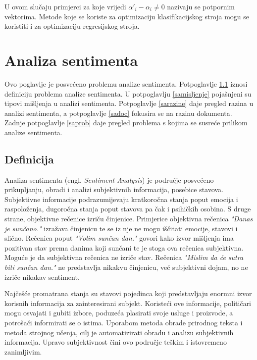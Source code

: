 \documentclass[times, utf8, zavrsni, numeric]{fer}
\begin{document}
U ovom slučaju primjerci za koje vrijedi $\alpha'_i - \alpha_i \neq 0$ nazivaju se potpornim vektorima.
Metode koje se koriste za optimizaciju klasifikacijskog stroja mogu se koristiti i za optimizaciju
regresijskog stroja.

\chapter{Analiza sentimenta} \label{sentiment}
Ovo poglavlje je posvećeno problemu analize sentimenta.
Potpoglavlje \ref{def} iznosi definiciju problema analize sentimenta.
U potpoglavlju \ref{samisljenje} pojašnjeni su tipovi mišljenja u analizi sentimenta.
Potpoglavlje \ref{sarazine} daje pregled razina u analizi sentimenta, a potpoglavlje \ref{sadoc} 
fokusira se na razinu dokumenta.
Zadnje potpoglavlje \ref{saprob} daje pregled problema s kojima se susreće prilikom analize sentimenta.

\section{Definicija} \label{def}
Analiza sentimenta (engl. \textit{Sentiment Analysis}) je područje posvećeno 
prikupljanju, obradi i analizi subjektivnih informacija, posebice stavova.
Subjektivne informacije podrazumijevaju kratkoročna stanja poput emocija i raspoloženja,
dugoročna stanja poput stavova pa čak i psihičkih osobina.
S druge strane, objektivne rečenice izriču činjenice. 
Primjerice objektivna rečenica \textit{"Danas je sunčano."} izražava činjenicu te se iz nje ne mogu 
iščitati emocije, stavovi i slično. 
Rečenica poput \textit{"Volim sunčan dan."} govori kako izvor mišljenja ima pozitivan stav prema danima koji
sunčani te je stoga ova rečenica subjektivna.
Moguće je da subjektivna rečenica ne izriče stav. 
Rečenica \textit{"Mislim da će sutra biti sunčan dan."} ne predstavlja nikakvu činjenicu, već subjektivni dojam,
no ne izriče nikakav sentiment. 

\par Najčešće promatrana stanja su stavovi pojedinca koji predstavljaju enormni izvor korisnih 
informacija za zainteresirani subjekt.
Koristeći ove informacije, političari mogu osvajati i gubiti izbore, poduzeća plasirati
svoje usluge i proizvode, a potrošači informirati se o istima.
Uporabom metoda obrade prirodnog teksta i metoda strojnog učenja, cilj je automatizirati
obradu i analizu subjektivnih informacija.
Upravo subjektivnost čini ovo područje teškim i istovremeno zanimljivim.
\end{document}
